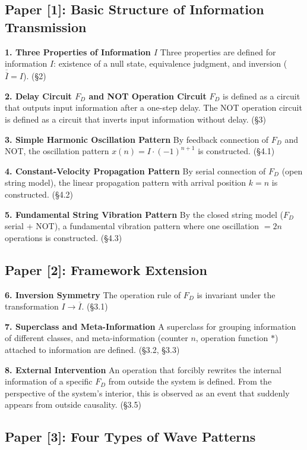 \documentclass[12pt,a4paper]{article}
\begin{document}
\subsection*{Paper [1]: Basic Structure of Information Transmission}

\textbf{1. Three Properties of Information $I$}\quad
Three properties are defined for information $I$: existence of a null state, equivalence judgment, and inversion ($\overline{\overline{I}} = I$). (\S 2)

\textbf{2. Delay Circuit $F_D$ and NOT Operation Circuit}\quad
$F_D$ is defined as a circuit that outputs input information after a one-step delay. The NOT operation circuit is defined as a circuit that inverts input information without delay. (\S 3)

\textbf{3. Simple Harmonic Oscillation Pattern}\quad
By feedback connection of $F_D$ and NOT, the oscillation pattern $x(n) = I \cdot (-1)^{n+1}$ is constructed. (\S 4.1)

\textbf{4. Constant-Velocity Propagation Pattern}\quad
By serial connection of $F_D$ (open string model), the linear propagation pattern with arrival position $k = n$ is constructed. (\S 4.2)

\textbf{5. Fundamental String Vibration Pattern}\quad
By the closed string model ($F_D$ serial + NOT), a fundamental vibration pattern where one oscillation $= 2n$ operations is constructed. (\S 4.3)

\subsection*{Paper [2]: Framework Extension}

\textbf{6. Inversion Symmetry}\quad
The operation rule of $F_D$ is invariant under the transformation $I \to \overline{I}$. (\S 3.1)

\textbf{7. Superclass and Meta-Information}\quad
A superclass for grouping information of different classes, and meta-information (counter $n$, operation function $*$) attached to information are defined. (\S 3.2, \S 3.3)

\textbf{8. External Intervention}\quad
An operation that forcibly rewrites the internal information of a specific $F_D$ from outside the system is defined. From the perspective of the system's interior, this is observed as an event that suddenly appears from outside causality. (\S 3.5)

\subsection*{Paper [3]: Four Types of Wave Patterns}
\end{document}
